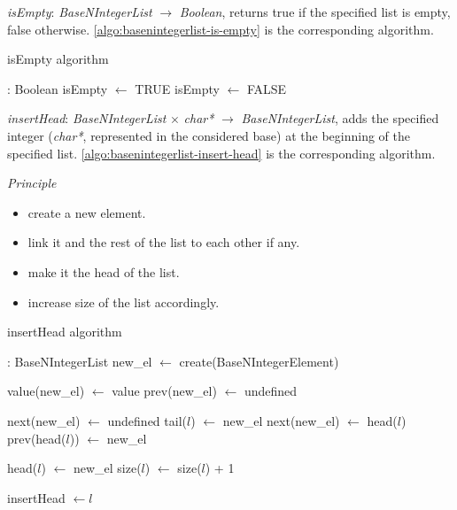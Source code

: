 \documentclass[book, nodocumentinfo]{upmethodology-document}
\begin{document}
\emph{isEmpty}: \emph{BaseNIntegerList} \(\rightarrow\) \emph{Boolean},
returns true if the specified list is empty, false otherwise.
\ref{algo:basenintegerlist-is-empty} is the corresponding algorithm.

\begin{algorithm}[H]
    \label{algo:basenintegerlist-is-empty}
    \caption{isEmpty algorithm}

    \begin{algorithmic}
         : Boolean
                \State isEmpty \(\leftarrow\) TRUE
            \Else
                \State isEmpty \(\leftarrow\) FALSE
            \EndIf
        \EndFunction
    \end{algorithmic}
\end{algorithm}

\emph{insertHead}: \emph{BaseNIntegerList} \(\times\) \emph{char*} \(\rightarrow\) \emph{BaseNIntegerList},
adds the specified integer (\emph{char*}, represented in the considered base) at the beginning
of the specified list.
\ref{algo:basenintegerlist-insert-head} is the corresponding algorithm.

\emph{Principle}
\begin{itemize}
    \item create a new element.
    \item link it and the rest of the list to each other if any.
    \item make it the head of the list.
    \item increase size of the list accordingly.
\end{itemize}

\begin{algorithm}[H]
    \label{algo:basenintegerlist-insert-head}
    \caption{insertHead algorithm}

    \begin{algorithmic}
         : BaseNIntegerList
            \State new\_el \(\leftarrow\) create(BaseNIntegerElement)

            \State value(new\_el) \(\leftarrow\) value
            \State prev(new\_el) \(\leftarrow\) undefined

                \State next(new\_el) \(\leftarrow\) undefined
                \State tail(\(l\)) \(\leftarrow\) new\_el
            \Else
                \State next(new\_el) \(\leftarrow\) head(\(l\))
                \State prev(head(\(l\))) \(\leftarrow\) new\_el
            \EndIf

            \State head(\(l\)) \(\leftarrow\) new\_el
            \State size(\(l\)) \(\leftarrow\) size(\(l\)) + 1

            \State insertHead \(\leftarrow l\)
        \EndFunction
    \end{algorithmic}
\end{algorithm}
\end{document}
